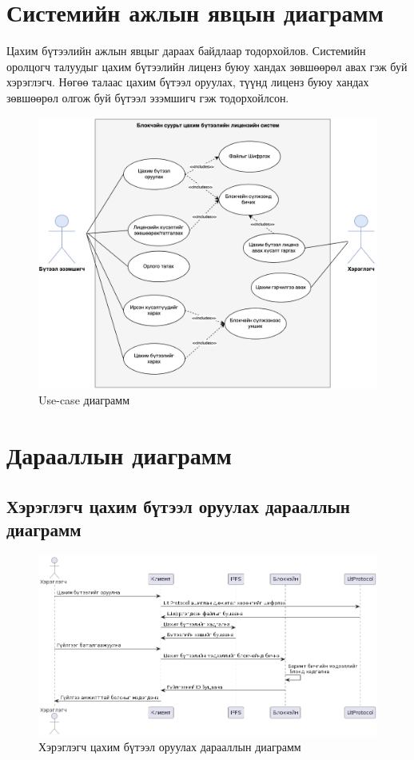 \newpage
\section{Системийн ажлын явцын диаграмм}
Цахим бүтээлийн ажлын явцыг дараах байдлаар тодорхойлов. Системийн оролцогч талуудыг цахим бүтээлийн лиценз буюу хандах зөвшөөрөл авах гэж буй хэрэглэгч. Нөгөө талаас цахим бүтээл оруулах, түүнд лиценз буюу хандах зөвшөөрөл олгож буй бүтээл эзэмшигч гэж тодорхойлсон.
\begin{figure}[h!]
	\centering
	\includegraphics[scale=0.36]{src/images/usecase.png}
	\caption{Use-case диаграмм}
\end{figure}

\pagebreak
\section{Дарааллын диаграмм}
\subsection{Хэрэглэгч цахим бүтээл оруулах дарааллын диаграмм}
\begin{figure}[h!]
	\centering
	\includegraphics[scale=0.55, angle=90]{src/images/sequence.png}
	\caption{Хэрэглэгч цахим бүтээл оруулах дарааллын диаграмм}
\end{figure}
